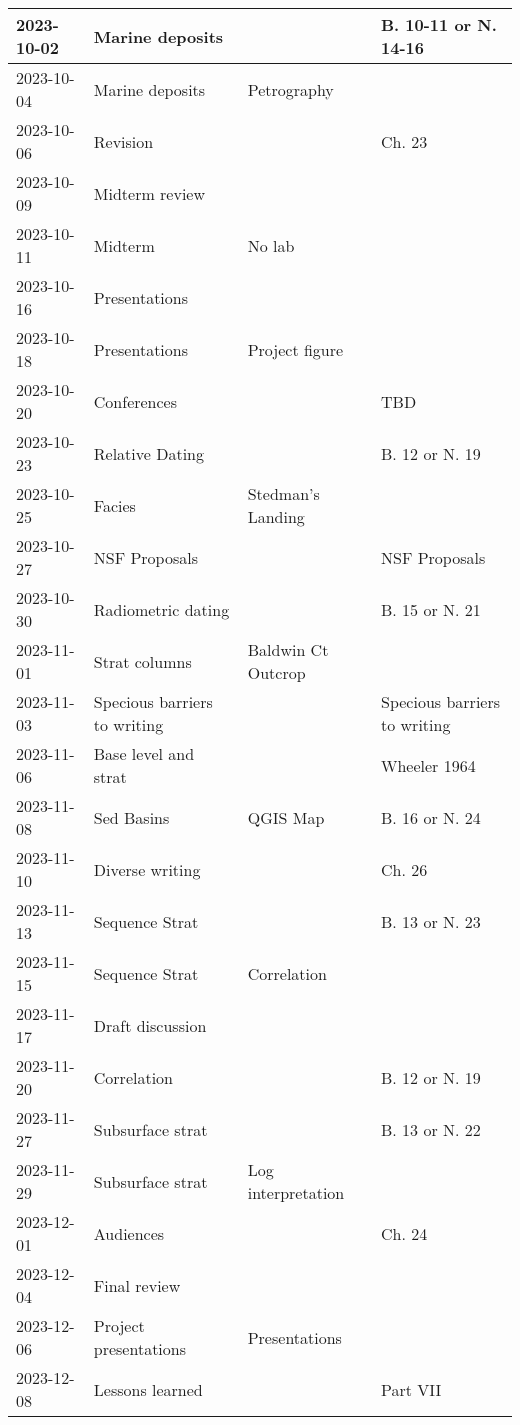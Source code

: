 \documentclass[11pt,]{article}
\begin{document}
\begin{table}
\begin{tabular}[t]{l|>{\raggedright\arraybackslash}p{5cm}|>{\raggedright\arraybackslash}p{5cm}|>{\raggedright\arraybackslash}p{5cm}}
\hline
2023-10-02 & Marine deposits &  & B. 10-11 or N. 14-16\\
\hline
2023-10-04 & Marine deposits & Petrography & \\
\hline
2023-10-06 & Revision &  & Ch. 23\\
\hline
2023-10-09 & Midterm review &  & \\
\hline
2023-10-11 & Midterm & No lab & \\
\hline
2023-10-16 & Presentations &  & \\
\hline
2023-10-18 & Presentations & Project figure & \\
\hline
2023-10-20 & Conferences &  & TBD\\
\hline
2023-10-23 & Relative Dating &  & B. 12 or N. 19\\
\hline
2023-10-25 & Facies & Stedman's Landing & \\
\hline
2023-10-27 & NSF Proposals &  & NSF Proposals\\
\hline
2023-10-30 & Radiometric dating &  & B. 15 or N. 21\\
\hline
2023-11-01 & Strat columns & Baldwin Ct Outcrop & \\
\hline
2023-11-03 & Specious barriers to writing &  & Specious barriers to writing\\
\hline
2023-11-06 & Base level and strat &  & Wheeler 1964\\
\hline
2023-11-08 & Sed Basins & QGIS Map & B. 16 or N. 24\\
\hline
2023-11-10 & Diverse writing &  & Ch. 26\\
\hline
2023-11-13 & Sequence Strat &  & B. 13 or N. 23\\
\hline
2023-11-15 & Sequence Strat & Correlation & \\
\hline
2023-11-17 & Draft discussion &  & \\
\hline
2023-11-20 & Correlation &  & B. 12 or N. 19\\
\hline
2023-11-27 & Subsurface strat &  & B. 13 or N. 22\\
\hline
2023-11-29 & Subsurface strat & Log interpretation & \\
\hline
2023-12-01 & Audiences &  & Ch. 24\\
\hline
2023-12-04 & Final review &  & \\
\hline
2023-12-06 & Project presentations & Presentations & \\
\hline
2023-12-08 & Lessons learned &  & Part VII\\
\hline
\end{tabular}
\end{table}
\end{document}
